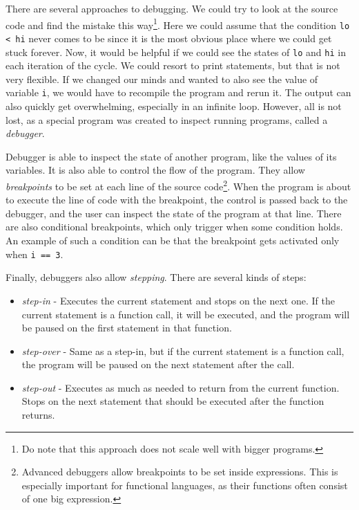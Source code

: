 There are several approaches to debugging. We could try to look at the source
code and find the mistake this way\footnote{Do note that this approach does not
scale well with bigger programs.}. Here we could assume that the condition
\texttt{lo < hi} never comes to be since it is the most obvious place where we
could get stuck forever. Now, it would be helpful if we could see the states of
\texttt{lo} and \texttt{hi} in each iteration of the cycle. We could resort to
print statements, but that is not very flexible. If we changed our minds and
wanted to also see the value of variable \texttt{i}, we would have to recompile
the program and rerun it. The output can also quickly get overwhelming,
especially in an infinite loop. However, all is not lost, as a special program
was created to inspect running programs, called a \textit{debugger}.

Debugger is able to inspect the state of another program, like the values of
its variables. It is also able to control the flow of the program. They allow
\textit{breakpoints} to be set at each line of the source
code\footnote{Advanced debuggers allow breakpoints to be set inside
expressions. This is especially important for functional languages, as their
functions often consist of one big expression.}. When the program is about to
execute the line of code with the breakpoint, the control is passed back to the
debugger, and the user can inspect the state of the program at that line. There
are also conditional breakpoints, which only trigger when some condition holds.
An example of such a condition can be that the breakpoint gets activated only
when \texttt{i == 3}.

Finally, debuggers also allow \textit{stepping}. There are several kinds of
steps:
\begin{itemize}
    \item \textit{step-in} - Executes the current statement and stops on the
        next one. If the current statement is a function call, it will be
        executed, and the program will be paused on the first statement in that
        function.
    \item \textit{step-over} - Same as a step-in, but if the current statement
        is a function call, the program will be paused on the next statement
        after the call.
    \item \textit{step-out} - Executes as much as needed to return from the
        current function. Stops on the next statement that should be executed
        after the function returns.
\end{itemize}

